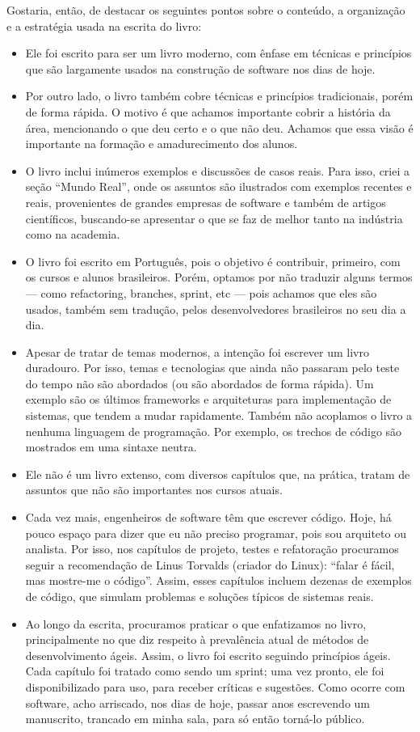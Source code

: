 \documentclass[
  11pt,
  twoside]{book}
\begin{document}
Gostaria, então, de destacar os seguintes pontos sobre o conteúdo, a
organização e a estratégia usada na escrita do livro:

\begin{itemize}
\item
  Ele foi escrito para ser um livro moderno, com ênfase em técnicas e
  princípios que são largamente usados na construção de software nos
  dias de hoje.
\item
  Por outro lado, o livro também cobre técnicas e princípios
  tradicionais, porém de forma rápida. O motivo é que achamos importante
  cobrir a história da área, mencionando o que deu certo e o que não
  deu. Achamos que essa visão é importante na formação e amadurecimento
  dos alunos.
\item
  O livro inclui inúmeros exemplos e discussões de casos reais. Para
  isso, criei a seção ``Mundo Real'', onde os assuntos são ilustrados
  com exemplos recentes e reais, provenientes de grandes empresas de
  software e também de artigos científicos, buscando-se apresentar o que
  se faz de melhor tanto na indústria como na academia.
\item
  O livro foi escrito em Português, pois o objetivo é contribuir,
  primeiro, com os cursos e alunos brasileiros. Porém, optamos por não
  traduzir alguns termos --- como refactoring, branches, sprint, etc ---
  pois achamos que eles são usados, também sem tradução, pelos
  desenvolvedores brasileiros no seu dia a dia.
\item
  Apesar de tratar de temas modernos, a intenção foi escrever um livro
  duradouro. Por isso, temas e tecnologias que ainda não passaram pelo
  teste do tempo não são abordados (ou são abordados de forma rápida).
  Um exemplo são os últimos frameworks e arquiteturas para implementação
  de sistemas, que tendem a mudar rapidamente. Também não acoplamos o
  livro a nenhuma linguagem de programação. Por exemplo, os trechos de
  código são mostrados em uma sintaxe neutra.
\item
  Ele não é um livro extenso, com diversos capítulos que, na prática,
  tratam de assuntos que não são importantes nos cursos atuais.
\item
  Cada vez mais, engenheiros de software têm que escrever código. Hoje,
  há pouco espaço para dizer que eu não preciso programar, pois sou
  arquiteto ou analista. Por isso, nos capítulos de projeto, testes e
  refatoração procuramos seguir a recomendação de Linus Torvalds
  (criador do Linux): ``falar é fácil, mas mostre-me o código''. Assim,
  esses capítulos incluem dezenas de exemplos de código, que simulam
  problemas e soluções típicos de sistemas reais.
\item
  Ao longo da escrita, procuramos praticar o que enfatizamos no livro,
  principalmente no que diz respeito à prevalência atual de métodos de
  desenvolvimento ágeis. Assim, o livro foi escrito seguindo princípios
  ágeis. Cada capítulo foi tratado como sendo um sprint; uma vez pronto,
  ele foi disponibilizado para uso, para receber críticas e sugestões.
  Como ocorre com software, acho arriscado, nos dias de hoje, passar
  anos escrevendo um manuscrito, trancado em minha sala, para só então
  torná-lo público.
\end{itemize}
\end{document}
